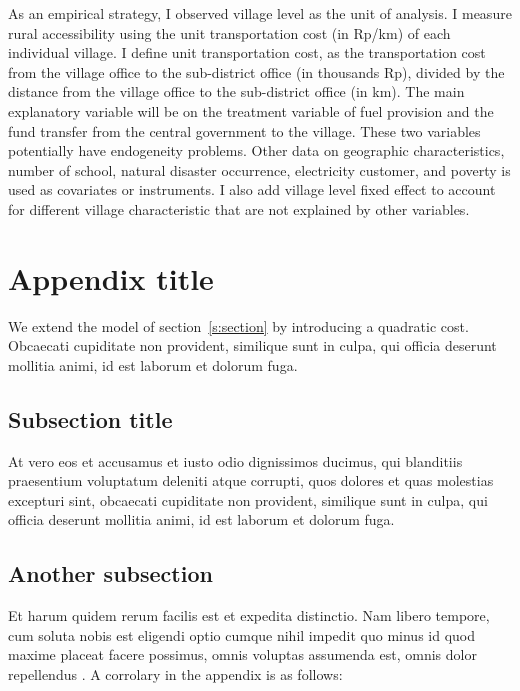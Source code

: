 \documentclass[letterpaper,11pt,leqno]{article}
\newcommand{\bib}{bibliography.bib}
\begin{document}
As an empirical strategy, I observed village level as the unit of analysis. I measure rural accessibility using the unit transportation cost (in Rp/km) of each individual village.  I define unit transportation cost, as the transportation cost from the village office to the sub-district office (in thousands Rp), divided by the distance from the village office to the sub-district office (in km). The main explanatory variable will be on the treatment variable of fuel provision and the fund transfer from the central government to the village. These two variables potentially have endogeneity problems.  Other  data on geographic characteristics, number of school, natural disaster occurrence, electricity customer, and poverty is used as covariates or instruments. I also add village level fixed effect to account for different village characteristic that are not explained by other variables.





\newpage
\appendix
\section{Appendix title}\label{a:appendix1}

We extend the model of section~\ref{s:section} by introducing a quadratic cost. Obcaecati cupiditate non provident, similique sunt in culpa, qui officia deserunt mollitia animi, id est laborum et dolorum fuga. 

\subsection{Subsection title} 

At vero eos et accusamus et iusto odio dignissimos ducimus, qui blanditiis praesentium voluptatum deleniti atque corrupti, quos dolores et quas molestias excepturi sint, obcaecati cupiditate non provident, similique sunt in culpa, qui officia deserunt mollitia animi, id est laborum et dolorum fuga. 

\subsection{Another subsection}

 Et harum quidem rerum facilis est et expedita distinctio. Nam libero tempore, cum soluta nobis est eligendi optio cumque nihil impedit quo minus id quod maxime placeat facere possimus, omnis voluptas assumenda est, omnis dolor repellendus \citep{MS22a}. A corrolary in the appendix is as follows:
\end{document}
